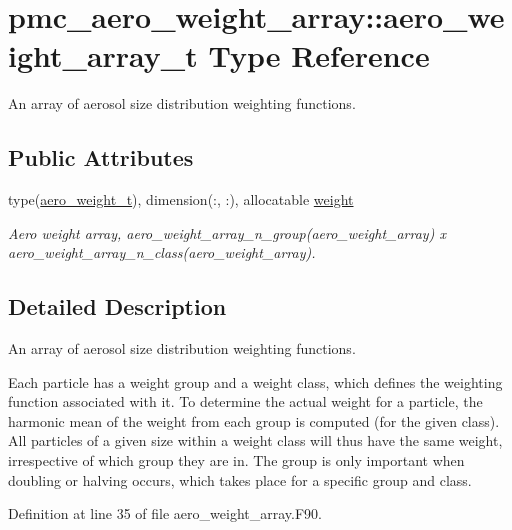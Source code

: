 \hypertarget{structpmc__aero__weight__array_1_1aero__weight__array__t}{}\section{pmc\+\_\+aero\+\_\+weight\+\_\+array\+:\+:aero\+\_\+weight\+\_\+array\+\_\+t Type Reference}
\label{structpmc__aero__weight__array_1_1aero__weight__array__t}


An array of aerosol size distribution weighting functions.  


\subsection*{Public Attributes}
\begin{DoxyCompactItemize}
\item 
type(\mbox{\hyperlink{structpmc__aero__weight_1_1aero__weight__t}{aero\+\_\+weight\+\_\+t}}), dimension(\+:, \+:), allocatable \mbox{\hyperlink{structpmc__aero__weight__array_1_1aero__weight__array__t_ad521ea7fd52fa87d57f8f71c2d223e08}{weight}}
\begin{DoxyCompactList}\small\item\em Aero weight array, {\ttfamily aero\+\_\+weight\+\_\+array\+\_\+n\+\_\+group(aero\+\_\+weight\+\_\+array) x aero\+\_\+weight\+\_\+array\+\_\+n\+\_\+class(aero\+\_\+weight\+\_\+array)}. \end{DoxyCompactList}\end{DoxyCompactItemize}


\subsection{Detailed Description}
An array of aerosol size distribution weighting functions. 

Each particle has a weight group and a weight class, which defines the weighting function associated with it. To determine the actual weight for a particle, the harmonic mean of the weight from each group is computed (for the given class). All particles of a given size within a weight class will thus have the same weight, irrespective of which group they are in. The group is only important when doubling or halving occurs, which takes place for a specific group and class. 

Definition at line 35 of file aero\+\_\+weight\+\_\+array.\+F90.



